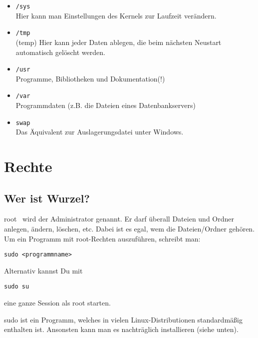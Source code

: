 \documentclass[a4paper,12pt]{article}
\begin{document}
\begin{itemize}
\item \texttt{/sys} \\ Hier kann man Einstellungen des Kernels zur Laufzeit verändern.
\item \texttt{/tmp} \\ (temp) Hier kann jeder Daten ablegen, die beim nächsten Neustart automatisch gelöscht werden.
\item \texttt{/usr} \\ Programme, Bibliotheken und Dokumentation(!)
\item \texttt{/var} \\ Programmdaten (z.B. die Dateien eines Datenbankservers)
\item \texttt{swap} \\ Das Äquivalent zur Auslagerungsdatei unter Windows.
\end{itemize}


\section{ Rechte}
\subsection{Wer ist Wurzel?}
\glqq root \grqq ~wird der Administrator genannt. Er darf überall Dateien 
und Ordner anlegen, ändern, löschen, etc. Dabei ist es egal, wem die 
Dateien/Ordner gehören. Um ein Programm mit root-Rechten auszuführen, 
schreibt man:
\begin{lstlisting}
sudo <programmname>
\end{lstlisting} 
Alternativ kannst Du mit
\begin{lstlisting}
sudo su
\end{lstlisting} 
eine ganze Session als root starten.

sudo ist ein Programm, welches in vielen Linux-Distributionen standardmäßig
enthalten ist. Ansonsten kann man es nachträglich installieren (siehe unten).
\end{document}
